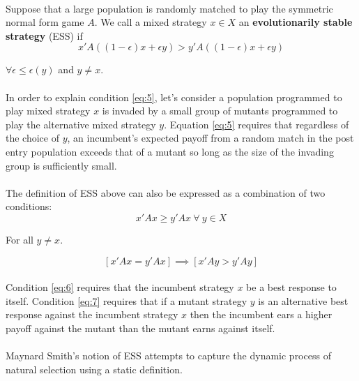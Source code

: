 \paragraph{}Suppose that a large population is randomly matched to play the symmetric normal form game $A$. We call a mixed strategy $x \in X$ an \textbf{evolutionarily stable strategy} (ESS) if 
\begin{equation}\label{eq:5}
x' A((1 - \epsilon)x + \epsilon y) > y' A((1 - \epsilon)x + \epsilon y) 
\end{equation}
\begin{center}
$\forall \epsilon \leq \epsilon(y)$ and $y \neq x.$
\end{center}
\paragraph{}In order to explain condition \ref{eq:5}, let's consider a population programmed to play mixed strategy $x$ is invaded by a small group of mutants programmed to play the alternative mixed strategy $y$. Equation \ref{eq:5} requires that regardless of the choice of $y$, an incumbent's expected payoff from a random match in the post entry population exceeds that of a mutant so long as the size of the invading group is sufficiently small.
\paragraph{}The definition of ESS above can also be expressed as a combination of two conditions: 
\begin{equation}\label{eq:6}
x' A x \geq y' A x  \: \forall  \: y \in X
\end{equation}
\begin{center}
For all $y \neq x.$
\end{center}
\begin{equation}\label{eq:7}
[x' A x = y' A x] \implies [x' A y > y' A y]
\end{equation}
\paragraph{}Condition \ref{eq:6} requires that the incumbent strategy $x$ be a best response to itself. Condition \ref{eq:7} requires that if a mutant strategy $y$ is an alternative best response against the incumbent strategy $x$ then the incumbent ears a higher payoff against the mutant than the mutant earns against itself.
\paragraph{}Maynard Smith's notion of ESS attempts to capture the dynamic process of natural selection using a static definition.

